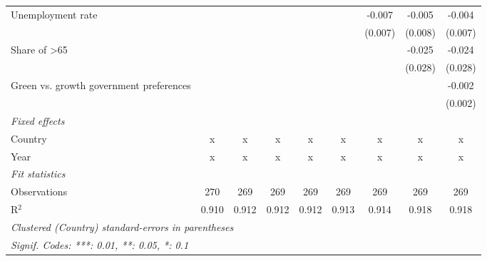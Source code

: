 \begin{table}[htbp]
\begin{tabular}{lcccccccc}
      Unemployment rate                                             &         &         &         &         &         & -0.007  & -0.005  & -0.004\\   
                                                                    &         &         &         &         &         & (0.007) & (0.008) & (0.007)\\   
      Share of >65                                                  &         &         &         &         &         &         & -0.025  & -0.024\\   
                                                                    &         &         &         &         &         &         & (0.028) & (0.028)\\   
      Green vs. growth government preferences                       &         &         &         &         &         &         &         & -0.002\\   
                                                                    &         &         &         &         &         &         &         & (0.002)\\   
      \emph{Fixed effects}\\
      Country                                                       & x       & x       & x       & x       & x       & x       & x       & x\\  
      Year                                                          & x       & x       & x       & x       & x       & x       & x       & x\\  
      \midrule \emph{Fit statistics}\\
      Observations                                                  & 270     & 269     & 269     & 269     & 269     & 269     & 269     & 269\\  
      R$^2$                                                         & 0.910   & 0.912   & 0.912   & 0.912   & 0.913   & 0.914   & 0.918   & 0.918\\  
      \midrule
      \multicolumn{9}{l}{\emph{Clustered (Country) standard-errors in parentheses}}\\
      \multicolumn{9}{l}{\emph{Signif. Codes: ***: 0.01, **: 0.05, *: 0.1}}\\
   \end{tabular}
\end{table}


